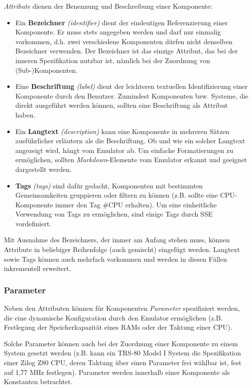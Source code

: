 \documentclass{scrartcl}
\begin{document}
\noindent \textit{Attribute} dienen der Benennung und Beschreibung einer Komponente:

\begin{itemize}
	\item Ein \textbf{Bezeichner} \textit{(identifier)} dient der eindeutigen Referenzierung einer Komponente. Er muss stets angegeben werden und darf nur einmalig vorkommen, d.h. zwei verschiedene Komponenten dürfen nicht denselben Bezeichner verwenden. Der Bezeichner ist das einzige Attribut, das bei der inneren Spezifikation nutzbar ist, nämlich bei der Zuordnung von (Sub-)Komponenten.
	\item Eine \textbf{Beschriftung} \textit{(label)} dient der leichteren textuellen Identifizierung einer Komponente durch den Benutzer. Zumindest Komponenten bzw. Systeme, die direkt ausgeführt werden können, sollten eine Beschriftung als Attribut haben.
	\item Ein \textbf{Langtext} \textit{(description)} kann eine Komponente in mehreren Sätzen ausführlicher erläutern als die Beschriftung. Ob und wie ein solcher Langtext angezeigt wird, hängt vom Emulator ab. Um einfache Formatierungen zu ermöglichen, sollten \textit{Markdown}-Elemente vom Emulator erkannt und geeignet dargestellt werden.
	\item \textbf{Tags} \textit{(tags)} sind dafür gedacht, Komponenten mit bestimmten Gemeinsamkeiten gruppieren oder filtern zu können (z.B. sollte eine CPU-Komponente immer den Tag \#CPU erhalten). Um eine einheitliche Verwendung von Tags zu ermöglichen, sind einige Tags durch SSE vordefiniert.
\end{itemize}

\noindent Mit Ausnahme des Bezeichners, der immer am Anfang stehen muss, können Attribute in beliebiger Reihenfolge (auch gemischt) eingefügt werden. Langtext sowie Tags können auch mehrfach vorkommen und werden in diesen Fällen inkrementell erweitert.

\subsubsection{Parameter}

\noindent Neben den Attributen können für Komponenten \textit{Parameter} spezifiziert werden, die eine dynamische Konfiguration durch den Emulator ermöglichen (z.B. Festlegung der Speicherkapazität eines RAMs oder der Taktung einer CPU).

\vspace{10pt}
\noindent Solche Parameter können auch bei der Zuordnung einer Komponente zu einem System gesetzt werden (z.B. kann ein TRS-80 Model I System die Spezifikation einer Zilog Z80 CPU, deren Taktung über einen Parameter frei wählbar ist, fest auf 1,77 MHz festlegen). Parameter werden innerhalb einer Komponente als Konstanten betrachtet.
\end{document}
